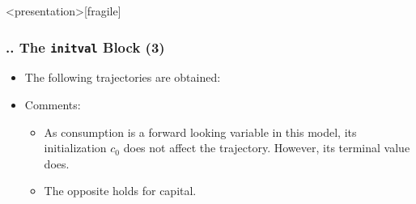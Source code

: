 \documentclass[11pt,aspectratio=169]{beamer}
\begin{document}
\begin{frame}<presentation>[fragile]
	\frametitle{{\thesection.\thesubsection.\thesubsubsection} The \texttt{initval} Block (3)}
	\begin{itemize}
		\item The following trajectories are obtained:
		\begin{figure}
			\centering
			\qquad
			\qquad
		\end{figure}
		\item Comments:
			\begin{itemize}
				\item As consumption is a forward looking variable in this model, its initialization $c_0$ does not affect the trajectory. However, its terminal value does.
				\item The opposite holds for capital. 
			\end{itemize}
	\end{itemize}
\end{frame}
\end{document}
